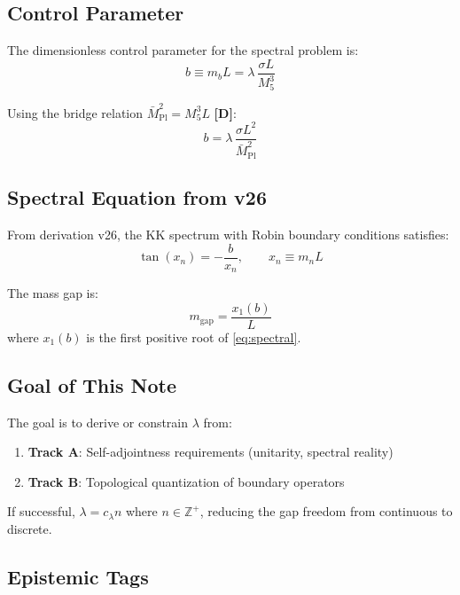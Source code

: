 \documentclass[11pt,a4paper]{article}
\newcommand{\Mpl}{\bar{M}_{\mathrm{Pl}}}
\newcommand{\Mfive}{M_5}
\newcommand{\mgap}{m_{\mathrm{gap}}}
\newcommand{\mb}{m_b}
\newcommand{\tagD}{\textbf{[D]}}
\theoremstyle{definition}
\theoremstyle{plain}
\theoremstyle{remark}
\begin{document}
\subsection{Control Parameter}

The dimensionless control parameter for the spectral problem is:
\begin{equation}
b \equiv \mb L = \lambda \, \frac{\sigma L}{\Mfive^3}
\label{eq:b-def}
\end{equation}

Using the bridge relation $\Mpl^2 = \Mfive^3 L$ \tagD{}:
\begin{equation}
b = \lambda \, \frac{\sigma L^2}{\Mpl^2}
\label{eq:b-Mpl}
\end{equation}

\subsection{Spectral Equation from v26}

From derivation v26, the KK spectrum with Robin boundary conditions satisfies:
\begin{equation}
\tan(x_n) = -\frac{b}{x_n}, \qquad x_n \equiv m_n L
\label{eq:spectral}
\end{equation}

The mass gap is:
\begin{equation}
\mgap = \frac{x_1(b)}{L}
\label{eq:gap}
\end{equation}
where $x_1(b)$ is the first positive root of \cref{eq:spectral}.

\subsection{Goal of This Note}

The goal is to derive or constrain $\lambda$ from:
\begin{enumerate}
\item \textbf{Track A}: Self-adjointness requirements (unitarity, spectral reality)
\item \textbf{Track B}: Topological quantization of boundary operators
\end{enumerate}

If successful, $\lambda = c_\lambda n$ where $n \in \mathbb{Z}^+$, reducing the gap freedom
from continuous to discrete.

\subsection{Epistemic Tags}
\end{document}
